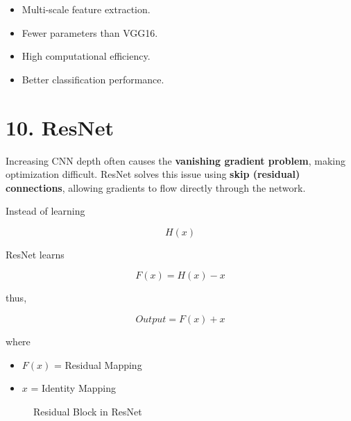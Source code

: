 \documentclass[11pt]{article}
\begin{document}
\begin{itemize}
\item Multi-scale feature extraction.
\item Fewer parameters than VGG16.
\item High computational efficiency.
\item Better classification performance.
\end{itemize}


\section*{10. ResNet}

Increasing CNN depth often causes the \textbf{vanishing gradient problem},
making optimization difficult. ResNet solves this issue using
\textbf{skip (residual) connections}, allowing gradients to flow directly
through the network.

Instead of learning

\[
H(x)
\]

ResNet learns

\[
F(x)=H(x)-x
\]

thus,

\[
Output = F(x)+x
\]

where

\begin{itemize}
\item $F(x)$ = Residual Mapping
\item $x$ = Identity Mapping
\end{itemize}

\begin{figure}[H]
\centering


\caption{Residual Block in ResNet}
\end{figure}
\end{document}

